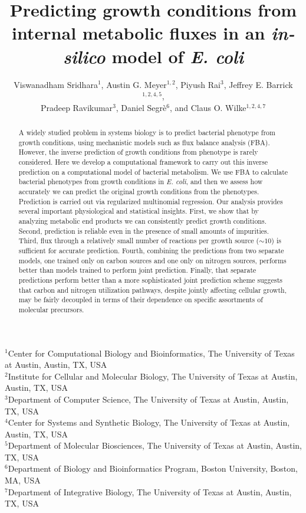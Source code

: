 \documentclass[12pt]{article}
\begin{document}
\title{Predicting growth conditions from internal metabolic fluxes in an \emph{in-silico} model of \emph{E. coli}}

\author{Viswanadham Sridhara$^1$, Austin G. Meyer$^{1,2}$, Piyush Rai$^3$, Jeffrey E. Barrick$^{1,2,4,5}$,\\
Pradeep Ravikumar$^3$, Daniel Segr\`e$^6$, and Claus O. Wilke$^{1,2,4,7}$}
\maketitle

\noindent
$^1$Center for Computational Biology and Bioinformatics, The University of Texas at Austin, Austin, TX, USA\\
$^2$Institute for Cellular and Molecular Biology, The University of Texas at Austin, Austin, TX, USA\\
$^3$Department of Computer Science, The University of Texas at Austin, Austin, TX, USA\\
$^4$Center for Systems and Synthetic Biology, The University of Texas at Austin, Austin, TX, USA\\
$^5$Department of Molecular Biosciences, The University of Texas at Austin, Austin, TX, USA\\
$^6$Department of Biology and Bioinformatics Program, Boston University, Boston, MA, USA\\
$^7$Department of Integrative Biology, The University of Texas at Austin, Austin, TX, USA\\


\begin{abstract}
A widely studied problem in systems biology is to predict bacterial phenotype from growth conditions, using mechanistic models such as flux balance analysis (FBA). However, the inverse prediction of growth conditions from phenotype is rarely considered. Here we develop a computational framework to carry out this inverse prediction on a computational model of bacterial metabolism. We use FBA to calculate bacterial phenotypes from growth conditions in \emph{E. coli}, and then we assess how accurately we can predict the original growth conditions from the phenotypes. Prediction is carried out via regularized multinomial regression. Our analysis provides several important physiological and statistical insights. First, we show that by analyzing metabolic end products we can consistently predict growth conditions. Second, prediction is reliable even in the presence of small amounts of impurities. Third, flux through a relatively small number of reactions per growth source ($\mathord{\sim}10$) is sufficient for accurate prediction. Fourth, combining the predictions from two separate models, one trained only on carbon sources and one only on nitrogen sources, performs better than models trained to perform joint prediction. Finally, that separate predictions perform better than a more sophisticated joint prediction scheme suggests that carbon and nitrogen utilization pathways, despite jointly affecting cellular growth, may be fairly decoupled in terms of their dependence on specific assortments of molecular precursors.
\end{abstract}
\end{document}
